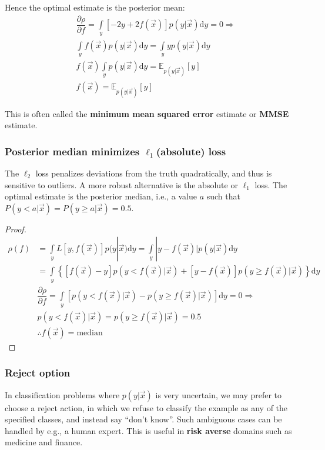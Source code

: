 Hence the optimal estimate is the posterior mean:
\begin{align}
& \dfrac{\partial \rho}{\partial f} =\int\limits_y [-2y+2f(\vec{x})]p(y|\vec{x})\mathrm{d}y=0 \Rightarrow \nonumber \\
& \int\limits_y f(\vec{x})p(y|\vec{x})\mathrm{d}y = \int\limits_y yp(y|\vec{x})\mathrm{d}y \nonumber \\
& f(\vec{x}) \int\limits_y p(y|\vec{x})\mathrm{d}y = \mathbb{E}_{p(y|\vec{x})}[y] \nonumber \\
& f(\vec{x}) = \mathbb{E}_{p(y|\vec{x})}[y]
\end{align}

This is often called the \textbf{minimum mean squared error} estimate or \textbf{MMSE} estimate.


\subsubsection{Posterior median minimizes $\ell_1$(absolute) loss}
The $\ell_2$ loss penalizes deviations from the truth quadratically, and thus is sensitive to outliers. A more robust alternative is the absolute or $\ell_1$ loss. The optimal estimate is the posterior median, i.e., a value $a$ such that $P(y<a|\vec{x})=P(y \geq a|\vec{x})=0.5$.

\begin{proof}
\begin{align*}
\rho(f)& =\int\limits_y L[y,f(\vec{x})]p(y|\vec{x})\mathrm{d}y=\int\limits_y |y-f(\vec{x})|p(y|\vec{x})\mathrm{d}y \\
       & =\int\limits_y \left\{[f(\vec{x})-y]p(y<f(\vec{x})|\vec{x})+[y-f(\vec{x})]p(y \geq f(\vec{x})|\vec{x})\right\}\mathrm{d}y \\
& \dfrac{\partial \rho}{\partial f}=\int\limits_y \left[p(y<f(\vec{x})|\vec{x})-p(y \geq f(\vec{x})|\vec{x})\right]\mathrm{d}y=0 \Rightarrow \\
& p(y<f(\vec{x})|\vec{x})=p(y \geq f(\vec{x})|\vec{x})=0.5 \\
& \therefore f(\vec{x})=\text{median}
\end{align*}
\end{proof}


\subsubsection{Reject option}
In classification problems where $p(y|\vec{x})$ is very uncertain, we may prefer to choose a reject action, in which we refuse to classify the example as any of the specified classes, and instead say “don’t know”. Such ambiguous cases can be handled by e.g., a human expert. This is useful in \textbf{risk averse} domains such as medicine and finance.

